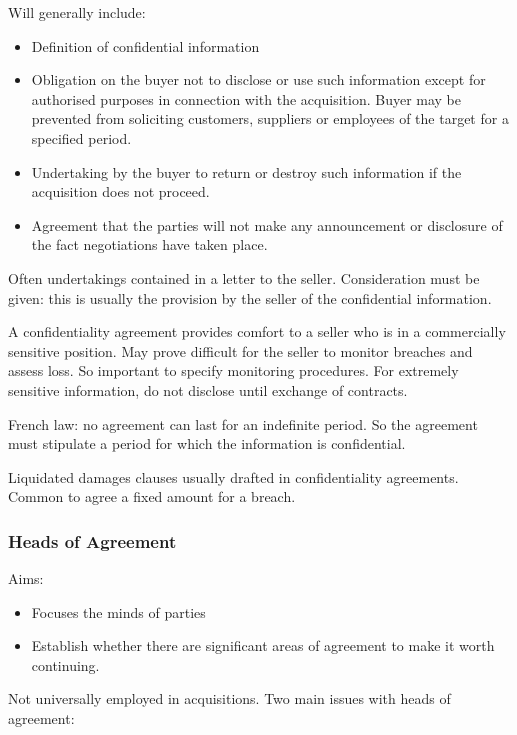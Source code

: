 \documentclass[
]{article}
\providecommand{\tightlist}{%
  \setlength{\itemsep}{0pt}\setlength{\parskip}{0pt}}
\begin{document}
Will generally include:

\begin{itemize}
\tightlist
\item
  Definition of confidential information
\item
  Obligation on the buyer not to disclose or use such information except
  for authorised purposes in connection with the acquisition. Buyer may
  be prevented from soliciting customers, suppliers or employees of the
  target for a specified period.
\item
  Undertaking by the buyer to return or destroy such information if the
  acquisition does not proceed.
\item
  Agreement that the parties will not make any announcement or
  disclosure of the fact negotiations have taken place.
\end{itemize}

Often undertakings contained in a letter to the seller. Consideration
must be given: this is usually the provision by the seller of the
confidential information.

A confidentiality agreement provides comfort to a seller who is in a
commercially sensitive position. May prove difficult for the seller to
monitor breaches and assess loss. So important to specify monitoring
procedures. For extremely sensitive information, do not disclose until
exchange of contracts.

French law: no agreement can last for an indefinite period. So the
agreement must stipulate a period for which the information is
confidential.

Liquidated damages clauses usually drafted in confidentiality
agreements. Common to agree a fixed amount for a breach.

\hypertarget{heads-of-agreement-1}{%
\subsubsection{Heads of Agreement}\label{heads-of-agreement-1}}

Aims:

\begin{itemize}
\tightlist
\item
  Focuses the minds of parties
\item
  Establish whether there are significant areas of agreement to make it
  worth continuing.
\end{itemize}

Not universally employed in acquisitions. Two main issues with heads of
agreement:
\end{document}
